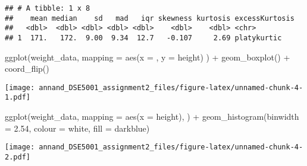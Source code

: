 \documentclass[
]{article}
\newenvironment{Shaded}{\begin{snugshade}}{\end{snugshade}}
\newcommand{\AttributeTok}[1]{\textcolor[rgb]{0.77,0.63,0.00}{#1}}
\newcommand{\FloatTok}[1]{\textcolor[rgb]{0.00,0.00,0.81}{#1}}
\newcommand{\FunctionTok}[1]{\textcolor[rgb]{0.00,0.00,0.00}{#1}}
\newcommand{\NormalTok}[1]{#1}
\newcommand{\SpecialCharTok}[1]{\textcolor[rgb]{0.00,0.00,0.00}{#1}}
\newcommand{\StringTok}[1]{\textcolor[rgb]{0.31,0.60,0.02}{#1}}
\begin{document}
\begin{verbatim}
## # A tibble: 1 x 8
##    mean median    sd   mad   iqr skewness kurtosis excessKurtosis
##   <dbl>  <dbl> <dbl> <dbl> <dbl>    <dbl>    <dbl> <chr>         
## 1  171.   172.  9.00  9.34  12.7   -0.107     2.69 platykurtic
\end{verbatim}

\begin{Shaded}
\begin{Highlighting}[]
\FunctionTok{ggplot}\NormalTok{(weight\_data,}
       \AttributeTok{mapping =} \FunctionTok{aes}\NormalTok{(}\AttributeTok{x =} \StringTok{\textquotesingle{}\textquotesingle{}}\NormalTok{, }\AttributeTok{y =}\NormalTok{ height)}
\NormalTok{) }\SpecialCharTok{+} \FunctionTok{geom\_boxplot}\NormalTok{() }\SpecialCharTok{+} \FunctionTok{coord\_flip}\NormalTok{()}
\end{Highlighting}
\end{Shaded}

\texttt{[image: annand\_DSE5001\_assignment2\_files/figure-latex/unnamed-chunk-4-1.pdf]}

\begin{Shaded}
\begin{Highlighting}[]
\FunctionTok{ggplot}\NormalTok{(weight\_data,}
       \AttributeTok{mapping =} \FunctionTok{aes}\NormalTok{(}\AttributeTok{x =}\NormalTok{ height),}
\NormalTok{) }\SpecialCharTok{+} \FunctionTok{geom\_histogram}\NormalTok{(}\AttributeTok{binwidth =} \FloatTok{2.54}\NormalTok{, }\AttributeTok{colour =} \StringTok{\textquotesingle{}white\textquotesingle{}}\NormalTok{,}
                   \AttributeTok{fill =} \StringTok{\textquotesingle{}darkblue\textquotesingle{}}\NormalTok{)}
\end{Highlighting}
\end{Shaded}

\texttt{[image: annand\_DSE5001\_assignment2\_files/figure-latex/unnamed-chunk-4-2.pdf]}
\end{document}
